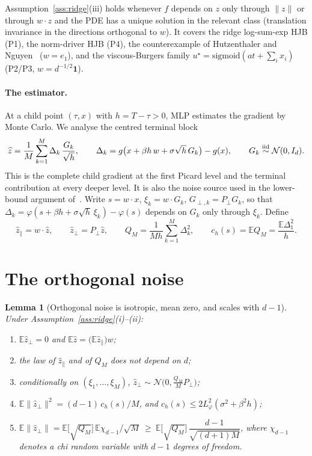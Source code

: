 \documentclass[11pt]{article}
\newtheorem{lemma}{Lemma}
\theoremstyle{remark}
\theoremstyle{definition}
\newcommand{\E}{\mathbb E}
\newcommand{\norm}[1]{\lVert #1\rVert}
\newcommand{\zh}{\widehat z}
\newcommand{\zpar}{\widehat z_{\parallel}}
\newcommand{\zperp}{\widehat z_{\perp}}
\newcommand{\Pperp}{P_{\perp}}
\begin{document}
Assumption~\ref{ass:ridge}(iii) holds whenever $f$ depends on $z$ only through
$\norm{z}$ or through $w\cdot z$ and the PDE has a unique solution in the relevant class
(translation invariance in the directions orthogonal to $w$). It covers the ridge
log-sum-exp HJB (P1), the norm-driver HJB (P4), the counterexample of
Hutzenthaler and Nguyen~\cite{HN2025} ($w=e_1$), and the viscous-Burgers family
$u^\star=\mathrm{sigmoid}(at+\sum_i x_i)$ (P2/P3, $w=d^{-1/2}\mathbf 1$).

\paragraph{The estimator.}
At a child point $(\tau,x)$ with $h=T-\tau>0$, MLP estimates the gradient by Monte Carlo.
We analyse the centred terminal block
\begin{equation}\label{eq:zhat}
\zh=\frac1M\sum_{k=1}^M \Delta_k\,\frac{G_k}{\sqrt h},\qquad
\Delta_k=g\bigl(x+\beta h\,w+\sigma\sqrt h\,G_k\bigr)-g(x),\qquad G_k\stackrel{\rm iid}{\sim}\mathcal N(0,I_d).
\end{equation}
This is the complete child gradient at the first Picard level and the terminal
contribution at every deeper level. It is also the noise source used in the lower-bound
argument of~\cite{HN2025}.
Write $s=w\cdot x$, $\xi_k=w\cdot G_k$, $G_{\perp,k}=\Pperp G_k$, so that
$\Delta_k=\varphi(s+\beta h+\sigma\sqrt h\,\xi_k)-\varphi(s)$ depends on $G_k$ only
through $\xi_k$. Define
\[
\zpar=w\cdot\zh,\qquad \zperp=\Pperp\zh,\qquad
Q_M=\frac1{Mh}\sum_{k=1}^M\Delta_k^2,\qquad c_h(s)=\E Q_M=\frac{\E\Delta_1^2}{h}.
\]

\section{The orthogonal noise}

\begin{lemma}[Orthogonal noise is isotropic, mean zero, and scales with $d-1$]\label{lem:perp}
Under Assumption~\ref{ass:ridge}(i)--(ii):
\begin{enumerate}
\item[(i)] $\E\zperp=0$ and $\E\zh=\bigl(\E\zpar\bigr)w$;
\item[(ii)] the law of $\zpar$ and of $Q_M$ does not depend on $d$;
\item[(iii)] conditionally on $(\xi_1,\dots,\xi_M)$,
$\zperp\sim\mathcal N\bigl(0,\tfrac{Q_M}{M}\Pperp\bigr)$;
\item[(iv)] $\E\norm{\zperp}^2=(d-1)\,c_h(s)/M$, and
$c_h(s)\le 2L_\varphi^2(\sigma^2+\beta^2h)$;
\item[(v)] $\E\norm{\zperp}=\E\bigl[\sqrt{Q_M}\bigr]\,\E\chi_{d-1}/\sqrt M
\ \ge\ \E\bigl[\sqrt{Q_M}\bigr]\,\dfrac{d-1}{\sqrt{(d+1)M}}$,
where $\chi_{d-1}$ denotes a chi random variable with $d-1$ degrees of freedom.
\end{enumerate}
\end{lemma}
\end{document}
